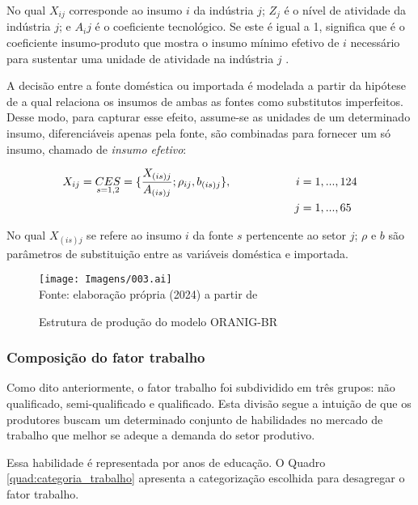 No qual $X_{ij}$ corresponde ao insumo $i$ da indústria $j$; $Z_j$ é o nível de atividade da indústria $j$; e $A_ij$ é o coeficiente tecnológico. Se este é igual a 1, significa que é o coeficiente insumo-produto que mostra o insumo mínimo efetivo de $i$ necessário para sustentar uma unidade de atividade na indústria $j$ \cite{dixit80}.

A decisão entre a fonte doméstica ou importada é modelada a partir da hipótese de \textcite{armington69} a qual relaciona os insumos de ambas as fontes como substitutos imperfeitos. Desse modo, para capturar esse efeito, assume-se as unidades de um determinado insumo, diferenciáveis apenas pela fonte, são combinadas para fornecer um só insumo, chamado de \textit{insumo efetivo}:

\begin{align}
	X_{ij} = \underset{s = 1, 2}{CES} = \{\frac{X_{(is)j}}{A_{(is)j}}; \rho_{ij}, b_{(is)j}\}, \hspace{2cm} i & = 1, ... , 124 \\ j & = 1, ... , 65 \notag
\end{align}

No qual $X_{(is)j}$ se refere ao insumo $i$ da fonte $s$ pertencente ao setor $j$; $\rho$ e $b$ são parâmetros de substituição entre as variáveis doméstica e importada. 

\begin{landscape}
	\begin{figure}
		\centering
		\caption{Estrutura de produção do modelo ORANIG-BR} \label{fig:estrutura_producao}
		\texttt{[image: Imagens/003.ai]}
		\footnotesize \\
		Fonte: elaboração própria (2024) a partir de \textcite{horridge00}
	\end{figure}
\end{landscape}

\subsubsection{Composição do fator trabalho} \label{}

Como dito anteriormente, o fator trabalho foi subdividido em três grupos: não qualificado, semi-qualificado e qualificado. Esta divisão segue a intuição de que os produtores buscam um determinado conjunto de habilidades no mercado de trabalho que melhor se adeque a demanda do setor produtivo.

Essa habilidade é representada por anos de educação. O Quadro \ref{quad:categoria_trabalho} apresenta a categorização escolhida para desagregar o fator trabalho.

